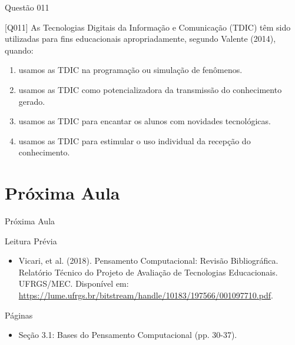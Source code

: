 \documentclass[xcolor=dvipsnames,table]{beamer}
\begin{document}
\begin{frame}{Questão 011}
		\begin{block}{[Q011]}
		 As Tecnologias Digitais da Informação e Comunicação (TDIC) têm sido utilizadas para fins educacionais apropriadamente, segundo Valente (2014), quando: 
		\end{block}
		\begin{enumerate}[label=(\Alph*)]
			\item usamos as TDIC na programação ou simulação de fenômenos. 
			\item usamos as TDIC como potencializadora da transmissão do conhecimento gerado.
			\item usamos as TDIC para encantar os alunos com novidades tecnológicas.
			\item usamos as TDIC para estimular o uso individual da recepção do conhecimento.
		\end{enumerate}
	\end{frame}

\section{Próxima Aula}
\begin{frame}{Próxima Aula}
    \begin{block}{Leitura Prévia}
        \begin{itemize}
            \item Vicari, et al. (2018). Pensamento Computacional: Revisão Bibliográfica. Relatório Técnico do Projeto de Avaliação de Tecnologias Educacionais. UFRGS/MEC. Disponível em: \url{https://lume.ufrgs.br/bitstream/handle/10183/197566/001097710.pdf}.  
        \end{itemize}
    \end{block}
    \begin{block}{Páginas}
        \begin{itemize}
        \item Seção 3.1: Bases do Pensamento Computacional (pp. 30-37).
        \end{itemize}
    \end{block}
\end{frame}
	
	\begin{frame}
		\titlepage
	\end{frame}
	
\end{document}
